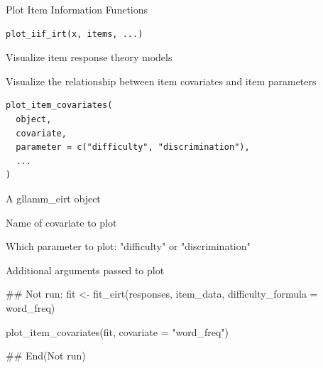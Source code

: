 \documentclass[a4paper]{book}
\begin{document}
%
\begin{Description}
Plot Item Information Functions
\end{Description}
%
\begin{Usage}
\begin{verbatim}
plot_iif_irt(x, items, ...)
\end{verbatim}
\end{Usage}
%
\begin{Description}
Visualize item response theory models
\end{Description}
%
\begin{Description}
Visualize the relationship between item covariates and item parameters
\end{Description}
%
\begin{Usage}
\begin{verbatim}
plot_item_covariates(
  object,
  covariate,
  parameter = c("difficulty", "discrimination"),
  ...
)
\end{verbatim}
\end{Usage}
%
\begin{Arguments}
\begin{ldescription}
\item[\code{object}] A gllamm\_eirt object

\item[\code{covariate}] Name of covariate to plot

\item[\code{parameter}] Which parameter to plot: "difficulty" or "discrimination"

\item[\code{...}] Additional arguments passed to plot
\end{ldescription}
\end{Arguments}
%
\begin{Examples}
\begin{ExampleCode}
## Not run: 
fit <- fit_eirt(responses, item_data,
                difficulty_formula = ~ word_freq)

plot_item_covariates(fit, covariate = "word_freq")

## End(Not run)

\end{ExampleCode}
\end{Examples}
\end{document}
